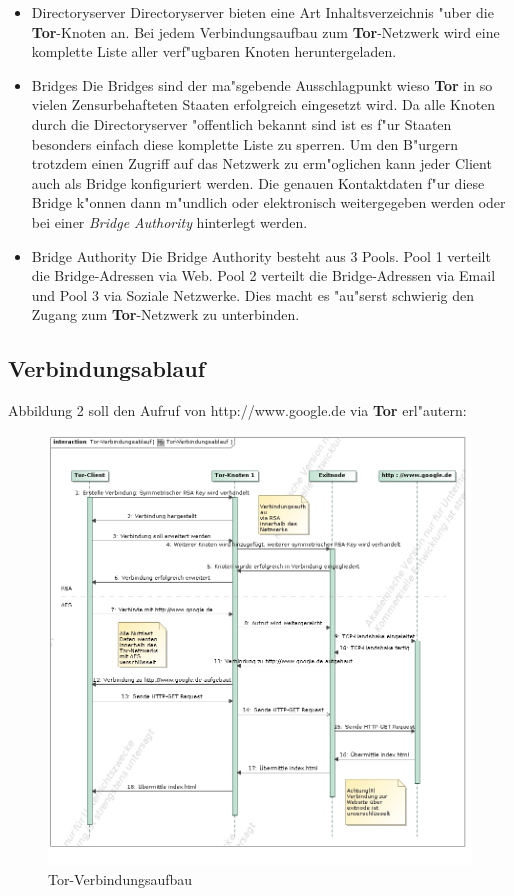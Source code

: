 \documentclass[titlepage]{article}
\begin{document}
\begin{itemize}
\item Directoryserver
\newline
Directoryserver bieten eine Art Inhaltsverzeichnis "uber die \textbf{Tor}-Knoten an. Bei jedem Verbindungsaufbau zum \textbf{Tor}-Netzwerk wird eine komplette Liste aller verf"ugbaren Knoten heruntergeladen.
\item Bridges
\newline
Die Bridges sind der ma"sgebende Ausschlagpunkt wieso \textbf{Tor} in so vielen Zensurbehafteten Staaten erfolgreich eingesetzt wird. Da alle Knoten durch die Directoryserver "offentlich bekannt sind ist es f"ur Staaten besonders einfach diese komplette Liste zu sperren. Um den B"urgern trotzdem einen Zugriff auf das Netzwerk zu erm"oglichen kann jeder Client auch als Bridge konfiguriert werden. Die genauen Kontaktdaten f"ur diese Bridge k"onnen dann m"undlich oder elektronisch weitergegeben werden oder bei einer \textit{Bridge Authority} hinterlegt werden. \cite{blocking}
\item Bridge Authority
\newline
Die Bridge Authority besteht aus 3 Pools. Pool 1 verteilt die Bridge-Adressen via Web. Pool 2 verteilt die Bridge-Adressen via Email und Pool 3 via Soziale Netzwerke. Dies macht es "au"serst schwierig den Zugang zum \textbf{Tor}-Netzwerk zu unterbinden.
\end{itemize}

\newpage
\subsection{Verbindungsablauf}
Abbildung 2 soll den Aufruf von http://www.google.de via \textbf{Tor} erl"autern:
\newline
\begin{figure}[h]
\includegraphics[scale=0.4]{Verbindungsablauf}
\centering
 \caption{Tor-Verbindungsaufbau}
 \label{Verbindungsablauf}
\end{figure}
\end{document}
